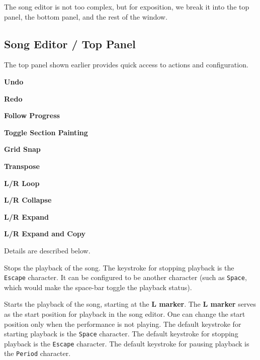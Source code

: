    The song editor is not too complex, but for exposition, we break it into
   the top panel, the bottom panel, and the rest of the window.

\subsection{Song Editor / Top Panel}
\label{subsec:song_editor_top}

   The top panel shown earlier provides quick access to actions
   and configuration.

   \begin{enumber}
      \item \textbf{Undo}
      \item \textbf{Redo}
      \item \textbf{Follow Progress}
      \item \textbf{Toggle Section Painting}
      \item \textbf{Grid Snap}
      \item \textbf{Transpose}
      \item \textbf{L/R Loop}
      \item \textbf{L/R Collapse}
      \item \textbf{L/R Expand}
      \item \textbf{L/R Expand and Copy}
   \end{enumber}

   Details are described below.

   \setcounter{ItemCounter}{0}      %

   Stops the playback of the song.
   The keystroke for stopping playback is the \texttt{Escape} character.
   It can be configured to be another character (such as \texttt{Space}, which
   would make the space-bar toggle the playback status).

   Starts the playback of the song, starting at the \textbf{L marker}.
   The \textbf{L marker} serves as the start position for playback
   in the song editor.  One can change the start position only when the
   performance is not playing.
   The default keystroke for starting playback is the \texttt{Space} character.
   The default keystroke for stopping playback is the \texttt{Escape} character.
   The default keystroke for pausing playback is the \texttt{Period} character.


